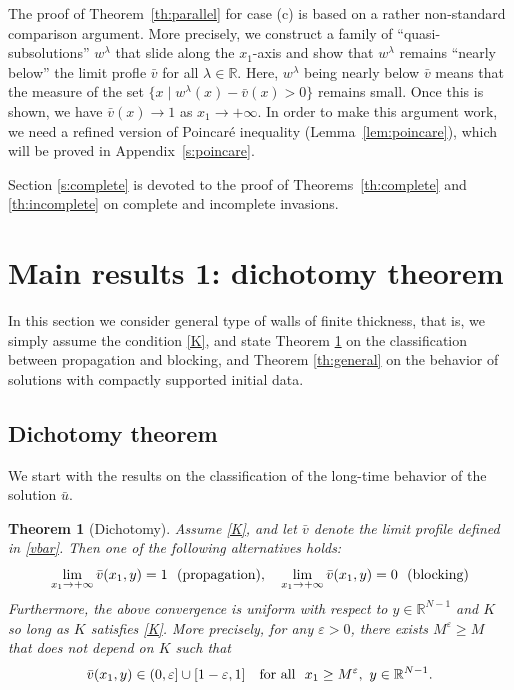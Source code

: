 \documentclass[a4paper,12pt,fullpage]{article}
\numberwithin{equation}{section}
\newtheorem{Thm}{Theorem}
\def\R{{\mathbb R}}
\def\ep{\varepsilon}
\begin{document}
The proof of Theorem~\ref{th:parallel} for case (c) is based on a rather non-standard comparison argument. More precisely, we construct a family of ``quasi-subsolutions'' $w^\lambda$ that slide along the $x_1$-axis and show that $w^\lambda$ remains ``nearly below'' the limit profle $\bar{v}$ for all $\lambda\in\R$. Here, $w^\lambda$ being nearly below $\bar{v}$ means that the measure of the set $\{x \mid w^\lambda(x) - \bar{v}(x)>0\}$ remains small. Once this is shown, we have $\bar{v}(x)\to 1$ as $x_1\to+\infty$. In order to make this argument work, we need a refined version of Poincar\'e inequality (Lemma~\ref{lem:poincare}), which will be proved in Appendix~\ref{s:poincare}. 

Section \ref{s:complete} is devoted to the proof of Theorems~\ref{th:complete} and \ref{th:incomplete} on complete and incomplete invasions. 


\section{Main results 1: dichotomy theorem}\label{s:main0}

In this section we consider general type of walls of finite thickness, that is, we simply assume the condition \eqref{K}, and state Theorem \ref{th:dichotomy} on the classification between propagation and blocking,  and Theorem \ref{th:general} on the behavior of solutions with compactly supported initial data.


\subsection{Dichotomy theorem}\label{ss:main-dichotomy}

We start with the results on the classification of the long-time behavior of the solution $\bar{u}$.

\begin{Thm}[Dichotomy]\label{th:dichotomy}
Assume \eqref{K}, and let $\bar{v}$ denote the limit profile defined in \eqref{vbar}. Then one of the following alternatives holds:
\[
\lim_{x_1\to +\infty} \bar{v}(x_1,y)=1\ \ \hbox{\rm (propagation)},\quad 
\lim_{x_1\to +\infty} \bar{v}(x_1,y)=0\ \ \hbox{\rm (blocking)} 
\]
Furthermore, the above convergence is uniform with respect to $y\in\R^{N-1}$ and $K$ so long as $K$ satisfies \eqref{K}. More precisely, for any $\ep>0$, there exists $M^\ep\geq M$ that does not depend on $K$ such that
\begin{equation}\label{vbar-ep}
\bar{v}(x_1,y)\in (0,\ep]\cup [1-\ep,1]\quad \hbox{for all}\ \ x_1\geq M^\ep,\ y\in\R^{N-1}.
\end{equation}
\end{Thm}
\end{document}
